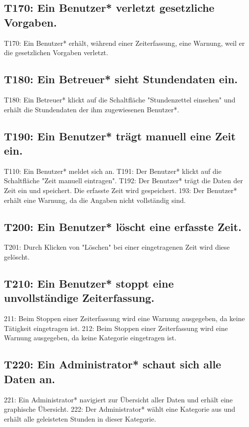 \subsection{T170: Ein Benutzer* verletzt gesetzliche Vorgaben.}
T170: Ein Benutzer* erhält, während einer Zeiterfassung, eine Warnung, weil er die gesetzlichen Vorgaben verletzt.
            
\subsection{T180: Ein Betreuer* sieht Stundendaten ein.}
T180: Ein Betreuer* klickt auf die Schaltfläche "Stundenzettel einsehen" und erhält die Stundendaten der ihm zugewiesenen Benutzer*.
        
\subsection{T190: Ein Benutzer* trägt manuell eine Zeit ein.}
T110: Ein Benutzer* meldet sich an.
T191: Der Benutzer* klickt auf die Schaltfläche "Zeit manuell eintragen".
T192: Der Benutzer* trägt die Daten der Zeit ein und speichert. Die erfasste Zeit wird gespeichert.
193: Der Benutzer* erhält eine Warnung, da die Angaben nicht vollständig sind.

\subsection{T200: Ein Benutzer* löscht eine erfasste Zeit.}
T201: Durch Klicken von "Löschen" bei einer eingetragenen Zeit wird diese gelöscht.
    
\subsection{T210: Ein Benutzer* stoppt eine unvollständige Zeiterfassung.}
211: Beim Stoppen einer Zeiterfassung wird eine Warnung ausgegeben, da keine Tätigkeit eingetragen ist.
212: Beim Stoppen einer Zeiterfassung wird eine Warnung ausgegeben, da keine Kategorie eingetragen ist.
            
\subsection{T220: Ein Administrator* schaut sich alle Daten an.}
221: Ein Administrator* navigiert zur Übersicht aller Daten und erhält eine graphische Übersicht.
222: Der Administrator* wählt eine Kategorie aus und erhält alle geleisteten Stunden in dieser Kategorie.
